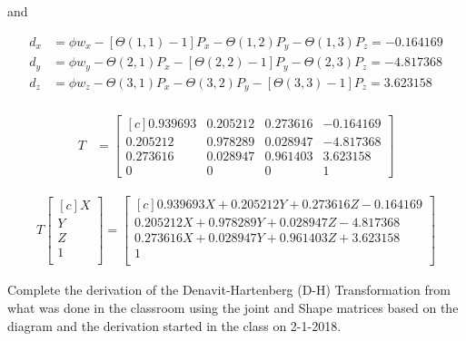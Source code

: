 \documentclass[onecolumn,10pt]{jhwhw}
\begin{document}
and

\begin{align*}
d_x &= \phi w_x - [\Theta \left (1, 1 \right) - 1] P_x - \Theta \left ( 1, 2 \right ) P_y - \Theta \left ( 1, 3 \right ) P_z = -0.164169 \\
d_y &= \phi w_y - \Theta \left (2, 1 \right) P_x - [\Theta \left ( 2, 2 \right ) - 1] P_y - \Theta \left ( 2, 3 \right ) P_z = -4.817368 \\
d_z &= \phi w_z - \Theta \left (3, 1 \right) P_x - \Theta \left ( 3, 2 \right ) P_y - [\Theta \left ( 3, 3 \right ) - 1] P_z =  3.623158 \\
\end{align*}

\begin{align*}
T &=
\begin{bmatrix*}[c]
0.939693 & 0.205212 & 0.273616 & -0.164169 \\
0.205212 & 0.978289 & 0.028947 & -4.817368 \\
0.273616 & 0.028947 & 0.961403 &  3.623158 \\
0 & 0 & 0 & 1
\end{bmatrix*}
\end{align*}

\begin{align*}
T
\begin{bmatrix*}[c]
X \\
Y \\
Z \\
1 \\
\end{bmatrix*}
=
\begin{bmatrix*}[c]
0.939693 X + 0.205212 Y + 0.273616 Z - 0.164169 \\
0.205212 X + 0.978289 Y + 0.028947 Z - 4.817368 \\
0.273616 X + 0.028947 Y + 0.961403 Z + 3.623158 \\
                                              1 \\
\end{bmatrix*}
\end{align*}

\problem{}
Complete the derivation of the Denavit-Hartenberg (D-H) Transformation from what was done in the classroom using the joint and Shape matrices based on the diagram and the derivation started in the class on 2-1-2018.
\end{document}

